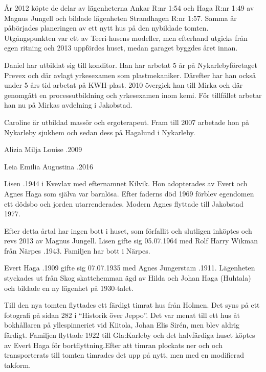 
År 2012 köpte de delar av lägenheterna Ankar R:nr 1:54 och Haga R:nr 1:49 av Magnus Jungell och bildade lägenheten Strandhagen R:nr 1:57. Samma år påbörjades planeringen av ett nytt hus på den nybildade tomten. Utgångspunkten var ett av Teeri-husens modeller, men efterhand utgicks från egen ritning och 2013 uppfördes huset, medan garaget byggdes året innan.

Daniel har utbildat sig till konditor. Han har arbetat 5 år på Nykarlebyföretaget Prevex och där avlagt yrkesexamen som plastmekaniker. Därefter har han också under 5 års tid arbetat på KWH-plast. 2010 övergick han till Mirka  och där genomgått en processutbildning och yrkesexamen inom kemi. För tillfället arbetar han nu på Mirkas avdelning i Jakobstad.

Caroline är utbildad massör och ergoterapeut. Fram till 2007 arbetade hon på Nykarleby sjukhem och sedan dess på Hagalund i Nykarleby.

\begin{jhchildren}
  \item{Alizia Milja Louise}{ .2009}
  \item{Leia Emilia Augustina}{ .2016}
\end{jhchildren}




Lisen .1944 i Kvevlax med efternamnet Kilvik. Hon adopterades av Evert och Agnes Haga som själva var barnlösa. Efter faderns död 1969 förblev egendomen ett dödsbo och jorden utarrenderades. Modern Agnes flyttade till Jakobstad 1977.

Efter detta årtal har ingen bott i huset, som förfallit och slutligen inköptes och revs 2013 av Magnus Jungell. Lisen gifte sig 05.07.1964 med Rolf Harry Wikman från Närpes .1943. Familjen har bott i Närpes.


Evert Haga .1909 gifte sig  07.07.1935  med Agnes Jungerstam .1911. Lägenheten styckades ut från Skog skattehemman ägd av Hilda och Johan Haga (Huhtala) och bildade en  ny lägenhet på 1930-talet.

Till den nya tomten flyttades ett färdigt timrat hus från Holmen. Det syns på ett fotografi på sidan 282 i ``Historik över Jeppo''. Det var menat till ett hus åt bokhållaren på yllespinneriet vid Kiitola, Johan Elis Sirén, men blev aldrig färdigt. Familjen flyttade 1922 till Gla:Karleby och det halvfärdiga huset köptes av Evert Haga för bortflyttning.Efter att timran plockats ner och och transporterats till tomten timrades det upp på nytt, men med en modifierad takform.

